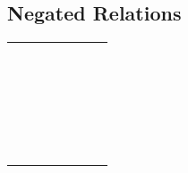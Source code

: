 \documentclass[11pt, a4paper, oneside]{article}
\theoremstyle{Plain}
\theoremstyle{Definition}
\theoremstyle{Remark}
\begin{document}
\begin{appendix}
	\subsection{{} Negated Relations \showfamily}

	\begin{tabular}{*8l}
	\X\nless        &\X\nleq        \\ \X\nleqslant   &\X\nleqq       \\
	\X\lneq         &\X\lneqq       \\ \X\lvertneqq   &\X\lnsim       \\
	\X\lnapprox     &\X\nprec       \\ \X\npreceq     &\X\precnsim    \\
	\X\precnapprox  &\X\nsim        \\ \X\nshortmid   &\X\nmid        \\
	\X\nvdash       &\X\nvDash      \\ \X\ntriangleleft&\X\ntrianglelefteq\\
	\X\nsubseteq    &\X\subsetneq   \\ \X\varsubsetneq&\X\subsetneqq  \\
	\X\varsubsetneqq&\X\ngtr        \\ \X\ngeq        &\X\ngeqslant   \\
	\X\ngeqq        &\X\gneq        \\ \X\gneqq       &\X\gvertneqq   \\
	\X\gnsim        &\X\gnapprox    \\ \X\nsucc       &\X\nsucceq     \\
	\X\nsucceqq     &\X\succnsim    \\ \X\succnapprox &\X\ncong       \\
	\X\nshortparallel&\X\nparallel  \\ \X\nvDash      &\X\nVDash      \\
	\X\ntriangleright&\X\ntrianglerighteq \\ \X\nsupseteq&\X\nsupseteqq\\
	\X\supsetneq    &\X\varsupsetneq \\ \X\supsetneqq  &\X\varsupsetneqq
	\end{tabular}

\fi

\clearpage  %

\end{appendix}
\end{document}
